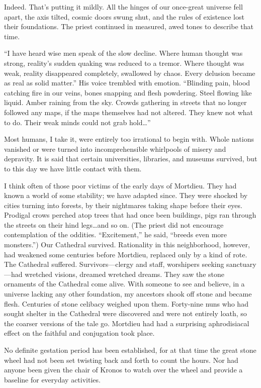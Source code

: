 Indeed. That's putting it mildly. All the hinges of our once-great universe fell apart, the axis tilted, cosmic doors swung shut, and the rules of existence lost their foundations. The priest continued in measured, awed tones to describe that time.

``I have heard wise men speak of the slow decline. Where human thought was strong, reality's sudden quaking was reduced to a tremor. Where thought was weak, reality disappeared completely, swallowed by chaos. Every delusion became as real as solid matter.'' His voice trembled with emotion. ``Blinding pain, blood catching fire in our veins, bones snapping and flesh powdering. Steel flowing like liquid. Amber raining from the sky. Crowds gathering in streets that no longer followed any maps, if the maps themselves had not altered. They knew not what to do. Their weak minds could not grab hold\ldots''

Most humans, I take it, were entirely too irrational to begin with. Whole nations vanished or were turned into incomprehensible whirlpools of misery and depravity. It is said that certain universities, libraries, and museums survived, but to this day we have little contact with them.

I think often of those poor victims of the early days of Mortdieu. They had known a world of some stability; we have adapted since. They were shocked by cities turning into forests, by their nightmares taking shape before their eyes. Prodigal crows perched atop trees that had once been buildings, pigs ran through the streets on their hind legs\ldots and so on. (The priest did not encourage contemplation of the oddities. ``Excitement,'' he said, ``breeds even more monsters.'') Our Cathedral survived. Rationality in this neighborhood, however, had weakened some centuries before Mortdieu, replaced only by a kind of rote. The Cathedral suffered. Survivors—clergy and staff, worshipers seeking sanctuary—had wretched visions, dreamed wretched dreams. They saw the stone ornaments of the Cathedral come alive. With someone to see and believe, in a universe lacking any other foundation, my ancestors shook off stone and became flesh. Centuries of stone celibacy weighed upon them. Forty-nine nuns who had sought shelter in the Cathedral were discovered and were not entirely loath, so the coarser versions of the tale go. Mortdieu had had a surprising aphrodisiacal effect on the faithful and conjugation took place.

No definite gestation period has been established, for at that time the great stone wheel had not been set twisting back and forth to count the hours. Nor had anyone been given the chair of Kronos to watch over the wheel and provide a baseline for everyday activities.

